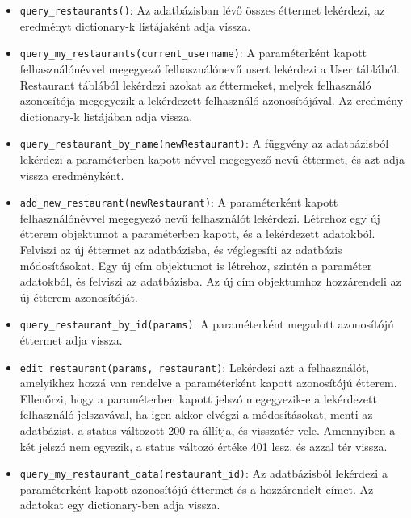 
\begin{itemize}
\item \texttt{query\_restaurants()}:
Az adatbázisban lévő összes éttermet lekérdezi, az eredményt dictionary-k listájaként adja vissza.
\item \texttt{query\_my\_restaurants(current\_username)}:
A paraméterként kapott felhasználónévvel megegyező felhasználónevű usert lekérdezi a User táblából. Restaurant táblából lekérdezi azokat az éttermeket, melyek felhasználó azonosítója megegyezik a lekérdezett felhasználó azonosítójával. Az eredmény dictionary-k listájában adja vissza.
\item \texttt{query\_restaurant\_by\_name(newRestaurant)}:
A függvény az adatbázisból lekérdezi a paraméterben kapott névvel megegyező nevű éttermet, és azt adja vissza eredményként.
\item \texttt{add\_new\_restaurant(newRestaurant)}:
A paraméterként kapott felhasználónévvel megegyező nevű felhasználót lekérdezi. Létrehoz egy új étterem objektumot a paraméterben kapott, és a lekérdezett adatokból. Felviszi az új éttermet az adatbázisba, és véglegesíti az adatbázis módosításokat. Egy új cím objektumot is létrehoz, szintén a paraméter adatokból, és felviszi az adatbázisba. Az új cím objektumhoz hozzárendeli az új étterem azonosítóját.
\item \texttt{query\_restaurant\_by\_id(params)}:
A paraméterként megadott azonosítójú éttermet adja vissza.
\item \texttt{edit\_restaurant(params, restaurant)}:
Lekérdezi azt a felhasználót, amelyikhez hozzá van rendelve a paraméterként kapott azonosítójú étterem. Ellenőrzi, hogy a paraméterben kapott jelszó megegyezik-e a lekérdezett felhasználó jelszavával, ha igen akkor elvégzi a módosításokat, menti az adatbázist, a status változott 200-ra állítja, és visszatér vele. Amennyiben a két jelszó nem egyezik, a status változó értéke 401 lesz, és azzal tér vissza.
\item \texttt{query\_my\_restaurant\_data(restaurant\_id)}:
Az adatbázisból lekérdezi a paraméterként kapott azonosítójú éttermet és a hozzárendelt címet. Az adatokat egy dictionary-ben adja vissza.
\end{itemize}



